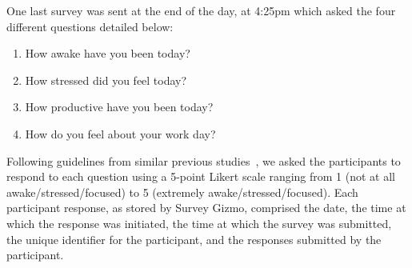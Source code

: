 One last survey was sent at the end of the day, at 4:25pm which asked the 
four different questions
detailed below:
\begin{enumerate}
\item How awake have you been today?
\item How stressed did you feel today?
\item How productive have you been today?
\item How do you feel about your work day?
\end{enumerate}

Following guidelines from similar previous studies~\cite{fogarty05,tanaka11}, we asked the participants to respond to each question using a 5-point Likert scale ranging from 1 (not at all awake/stressed/focused) to 5 (extremely awake/stressed/focused). Each participant response, as stored by Survey Gizmo, comprised the date, the time at which the response was initiated, the time at which the survey was submitted, the unique identifier for the participant, and the responses submitted by the participant.

